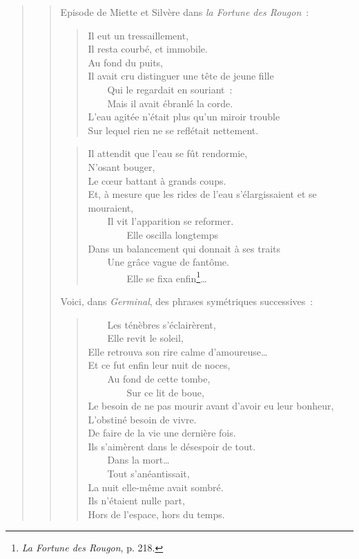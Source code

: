 \documentclass[french,twoside]{book} %
\begin{document}
\begin{verse}
\begin{verse}
\noindent Episode de Miette et Silvère dans \emph{la Fortune des Rougon} :\par


\begin{verse}
Il eut un tressaillement,\\
Il resta courbé, et immobile.\\
Au fond du puits,\\
Il avait cru distinguer une tête de jeune fille\\
    Qui le regardait en souriant :\\
    Mais il avait ébranlé la corde.\\
L’eau agitée n’était plus qu’un miroir trouble\\
Sur lequel rien ne se reflétait nettement.\\
\end{verse}



\begin{verse}
Il attendit que l’eau se fût rendormie,\\
N’osant bouger,\\
Le cœur battant à grands coups.\\
Et, à mesure que les rides de l’eau s’élargissaient et se mouraient,\\
    Il vit l’apparition se reformer.\\
        Elle oscilla longtemps\\
Dans un balancement qui donnait à ses traits\\
    Une grâce vague de fantôme.\\
        Elle se fixa enfin\footnote{\emph{La Fortune des Rougon}, p. 218.}…\\
\end{verse}

\noindent Voici, dans \emph{Germinal}, des phrases symétriques successives :\par


\begin{verse}
    Les ténèbres s’éclairèrent,\\
    Elle revit le soleil,\\
Elle retrouva son rire calme d’amoureuse…\\
Et ce fut enfin leur nuit de noces,\\
    Au fond de cette tombe,\\
        Sur ce lit de boue,\\
Le besoin de ne pas mourir avant d’avoir eu leur bonheur,\\
L’obstiné besoin de vivre.\\
De faire de la vie une dernière fois.\\
Ils s’aimèrent dans le désespoir de tout.\\
    Dans la mort…\\
    Tout s’anéantissait,\\
La nuit elle-même avait sombré.\\
Ils n’étaient nulle part,\\
Hors de l’espace, hors du temps.\\
\end{verse}


\end{verse}
\end{verse}
\end{document}
